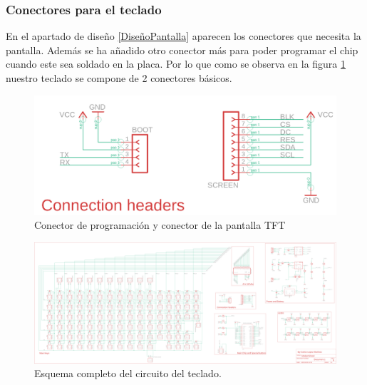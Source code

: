 \subsubsection{Conectores para el teclado}
En el apartado de diseño \ref{DiseñoPantalla} aparecen los conectores que necesita la pantalla. Además se ha añadido otro conector más para poder programar el chip cuando este sea soldado en la placa. Por lo que como se observa en la figura \ref{fig:CircuitoConectores} nuestro teclado se compone de 2 conectores básicos.

\begin{figure}[H]
    \centering
    \includegraphics[width=1.0\textwidth]{imagenes/Capitulos/Cap04/Conectores.png}
    \caption{Conector de programación y conector de la pantalla \gls{TFT}}
    \label{fig:CircuitoConectores}
\end{figure}

\begin{figure}
\centering
\includegraphics[width=\textheight]{imagenes/Capitulos/Cap04/Esquematico.png}
\caption{Esquema completo del circuito del teclado.}
\label{fig:CircuitoCompleto}
\end{figure}
